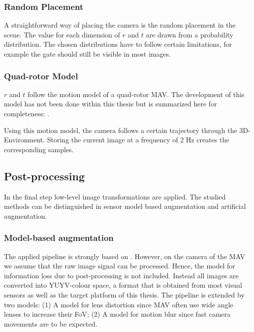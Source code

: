 \subsubsection{Random Placement}
	
A straightforward way of placing the camera is the random placement in the scene. The value for each dimension of $r$ and $t$ are drawn from a probability distribution. The chosen distributions have to follow certain limitations, for example the gate should still be visible in most images.
	
\subsubsection{Quad-rotor Model}
	
$r$ and $t$ follow the motion model of a quad-rotor \ac{MAV}.  The development of this model has not been done within this thesis but is summarized here for completeness: .

Using this motion model, the camera follows a certain trajectory through the 3D-Environment. Storing the current image at a frequency of 2 Hz creates the corresponding samples.
	
\subsection{Post-processing}

In the final step low-level image transformations are applied. The studied methods can be distinguished in sensor model based augmentation and artificial augmentation. 

\subsubsection{Model-based augmentation}

The applied pipeline is strongly based on \cite{Carlson2018}. However, on the camera of the \ac{MAV} we assume that the raw image signal can be processed. Hence, the model for information loss due to post-processing is not included. Instead all images are converted into YUYV-colour space, a format that is obtained from most visual sensors as well as the target platform of this thesis. The pipeline is extended by two models: (1) A model for lens distortion since \ac{MAV} often use wide angle lenses to increase their \ac{FoV}; (2) A model for motion blur since fast camera movements are to be expected.

